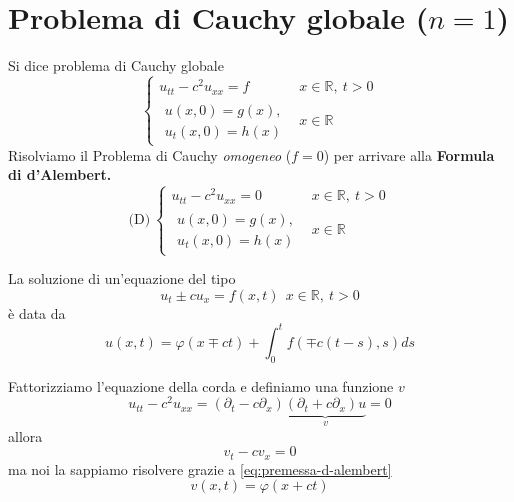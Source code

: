 \documentclass[10pt,a4paper,twoside,openright]{book}
\begin{document}
\section{Problema di Cauchy globale \texorpdfstring{($n=1$)}{(n=1)}}

Si dice problema di Cauchy globale
\begin{equation*}
	\begin{cases}
		u_{tt} -c^{2} u_{xx} =f & x\in \mathbb{R} ,\ t >0 \\
		\begin{array}{l}
		u( x,0) =g( x) ,\\
		u_{t}( x,0) =h( x)
		\end{array}             & x\in \mathbb{R}         
	\end{cases}
\end{equation*}
Risolviamo il Problema di Cauchy \textit{omogeneo} ($f=0$) per arrivare alla \textbf{Formula di d'Alembert.}
\begin{equation*}
	\text{(D)} \ \begin{cases}
	u_{tt} -c^{2} u_{xx} =0 & x\in \mathbb{R} ,\ t >0\\
	\begin{array}{l}
		u( x,0) =g( x) ,   \\
		u_{t}( x,0) =h( x) 
	\end{array} & x\in \mathbb{R}
	\end{cases}
\end{equation*}
\begin{nb}
	[Premessa] La soluzione di un'equazione del tipo
	\begin{equation*}
		u_{t} \pm cu_{x} =f( x,t) \ \ x\in \mathbb{R} ,\ t >0
	\end{equation*}
	è data da
	\begin{equation}
		u( x,t) =\varphi ( x\mp ct) +\int ^{t}_{0} f( \mp c( t-s) ,s) ds
		\label{eq:premessa-d-alembert}
	\end{equation}
\end{nb}
Fattorizziamo l'equazione della corda e definiamo una funzione $v$
\begin{equation*}
	u_{tt} -c^{2} u_{xx} =( \partial _{t} -c\partial _{x})\underbrace{( \partial _{t} +c\partial _{x}) u}_{v} =0
\end{equation*}
allora
\begin{equation*}
	v_{t} -cv_{x} =0
\end{equation*}
ma noi la sappiamo risolvere grazie a \eqref{eq:premessa-d-alembert}
\begin{equation*}
	v( x,t) =\varphi ( x+ct)
\end{equation*}
\end{document}

